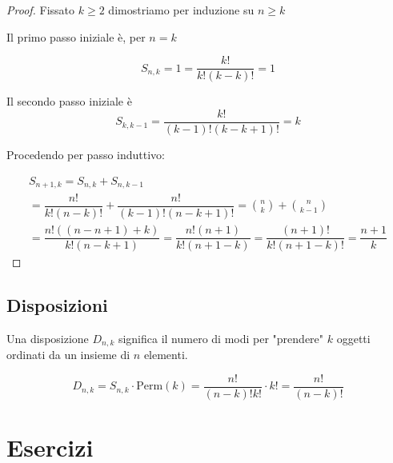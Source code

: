 \begin{proof}
	Fissato $ k \geq 2 $ dimostriamo per induzione su $ n \geq k $
	
	Il primo passo iniziale è, per $ n = k $

	\begin{equation*}
		S_{n,k} = 1 = \dfrac{k!}{k!(k-k)!} = 1
	\end{equation*}	
	
	Il secondo passo iniziale è
	\begin{equation*}
		S_{k,k-1} = \dfrac{k!}{(k-1)!(k-k+1)!} = k
	\end{equation*}
	
	Procedendo per passo induttivo:
	
	\begin{equation*}
		\begin{aligned}
			S_{n+1,k} = S_{n,k} + S_{n,k-1} \\
			= \dfrac{n!}{k!(n-k)!} + \dfrac{n!}{(k-1)!(n-k+1)!} = \binom{n}{k} + \binom{n}{k-1} \\
			= \dfrac{n!((n-n+1) + k)}{k!(n-k+1)} = \dfrac{n!(n+1)}{k!(n+1-k)} = \dfrac{(n+1)!}{k!(n+1-k)!} = \dfrac{n+1}{k}	
		\end{aligned}
	\end{equation*}
\end{proof}

\subsection{Disposizioni}

\begin{defn}
	Una disposizione $ D_{n,k} $ significa il numero di modi per "prendere" $ k $ oggetti ordinati da un insieme di $ n $ elementi.
	
	\begin{equation}
	D_{n,k} = S_{n,k} \cdot \text{Perm}(k) = \dfrac{n!}{(n-k)!k!} \cdot k! = \dfrac{n!}{(n-k)!}
	\end{equation}
\end{defn}


\section{Esercizi}

